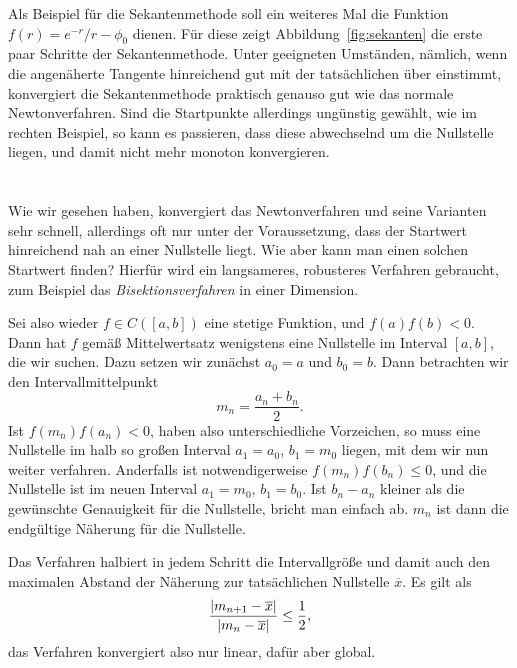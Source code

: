 Als Beispiel für die Sekantenmethode soll ein weiteres Mal die
Funktion $f(r) = e^{-r}/r - \phi_0$ dienen. Für diese zeigt
Abbildung~\ref{fig:sekanten} die erste paar Schritte der
Sekantenmethode. Unter geeigneten Umständen, nämlich, wenn die
angenäherte Tangente hinreichend gut mit der tatsächlichen über
einstimmt, konvergiert die Sekantenmethode praktisch genauso gut wie
das normale Newtonverfahren. Sind die Startpunkte allerdings ungünstig
gewählt, wie im rechten Beispiel, so kann es passieren, dass diese
abwechselnd um die Nullstelle liegen, und damit nicht mehr monoton
konvergieren.

\section{}

Wie wir gesehen haben, konvergiert das Newtonverfahren und seine
Varianten sehr schnell, allerdings oft nur unter der Voraussetzung,
dass der Startwert hinreichend nah an einer Nullstelle liegt. Wie aber
kann man einen solchen Startwert finden? Hierfür wird ein langsameres,
robusteres Verfahren gebraucht, zum Beispiel das
\emph{Bisektionsverfahren} in einer Dimension.

Sei also wieder $f\in C([a,b])$ eine stetige Funktion, und
$f(a)f(b)<0$. Dann hat $f$ gemäß Mittelwertsatz wenigstens eine
Nullstelle im Interval $[a,b]$, die wir suchen. Dazu setzen wir
zunächst $a_0=a$ und $b_0=b$. Dann betrachten wir den
Intervallmittelpunkt
\begin{equation}
  m_{n} = \frac{a_n + b_n}{2}.
\end{equation}
Ist $f(m_n)f(a_n) < 0$, haben also unterschiedliche Vorzeichen, so
muss eine Nullstelle im halb so großen Interval $a_1=a_0$, $b_1=m_0$
liegen, mit dem wir nun weiter verfahren. Anderfalls ist
notwendigerweise $f(m_n)f(b_n)\le 0$, und die Nullstelle ist im neuen
Interval $a_1=m_0$, $b_1 = b_0$. Ist $b_n - a_n$ kleiner als die
gewünschte Genauigkeit für die Nullstelle, bricht man einfach
ab. $m_n$ ist dann die endgültige Näherung für die Nullstelle.

Das Verfahren halbiert in jedem Schritt die Intervallgröße und damit
auch den maximalen Abstand der Näherung zur tatsächlichen
Nullstelle $\overline{x}$. Es gilt als
\begin{equation}
  \frac{\left\lvert{m_{n+1} - \overline{x}}\right\rvert}{\left\lvert{m_{n} - \overline{x}}\right\rvert}\le \frac{1}{2},
\end{equation}
das Verfahren konvergiert also nur linear, dafür aber global.

